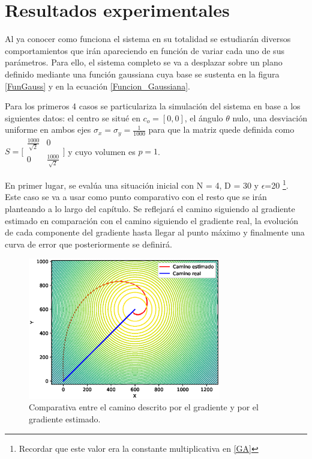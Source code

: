 \newpage
\thispagestyle{empty}
\mbox{}

\chapter{Resultados experimentales}
\label{ch:chapter3}

Al ya conocer como funciona el sistema en su totalidad se estudiarán diversos comportamientos que irán apareciendo en función de variar cada uno de sus parámetros. Para ello, el sistema completo se va a desplazar sobre un plano definido mediante una función gaussiana cuya base se sustenta en la figura \ref{FunGauss} y en la ecuación \ref{Funcion_Gaussiana}. 

Para los primeros 4 casos se particulariza la simulación del sistema en base a los siguientes datos: el centro se situé en $c_{o}=[0,0]$, el ángulo $\theta$ nulo, una desviación uniforme en ambos ejes $\sigma_{x}=\sigma_{y}=\frac{1}{1000}$ para que la matriz quede definida como $S = \bigl[\begin{smallmatrix}\frac{1000}{\sqrt{2}} & 0\\ 0 & \frac{1000}{\sqrt{2}}\end{smallmatrix}\bigr]$  y cuyo volumen es $p = 1$.

En primer lugar, se evalúa una situación inicial con N = 4, D = 30 y $\epsilon$=20 \footnote[8]{Recordar que este valor era la constante multiplicativa en \ref{GA}}. Este caso se va a usar como punto comparativo con el resto que se irán planteando a lo largo del capítulo. Se reflejará el camino siguiendo al gradiente estimado en comparación con el camino siguiendo el gradiente real, la evolución de cada componente del gradiente hasta llegar al punto máximo y finalmente una curva de error que posteriormente se definirá.

\begin{figure}[htb]
\centering
\includegraphics[width=0.75\textwidth]{figures/Caso_Inicial/Caminos.eps}
\caption{Comparativa entre el camino descrito por el gradiente y por el gradiente estimado.} \label{Dif_Caminos}
\end{figure}

